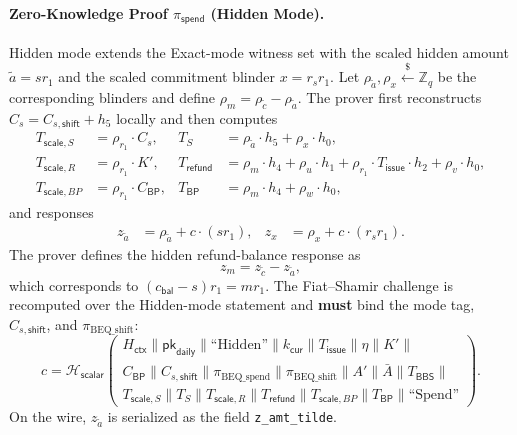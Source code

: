 \documentclass[11pt]{article}
\theoremstyle{definitionstyle}
\theoremstyle{plain}
\begin{document}
\paragraph{Zero-Knowledge Proof $\pi_{\mathsf{spend}}$ (Hidden Mode).}
Hidden mode extends the Exact-mode witness set with the scaled hidden amount $\widetilde{a} = s r_1$ and the scaled commitment blinder $x = r_s r_1$. Let $\rho_{\widetilde{a}}, \rho_x \xleftarrow{\$} \mathbb{Z}_q$ be the corresponding blinders and define $\rho_m = \rho_{\tilde{c}} - \rho_{\widetilde{a}}$. The prover first reconstructs $C_s = C_{s,\mathsf{shift}} + h_5$ locally and then computes
\begin{align*}
T_{\mathsf{scale},S} &= \rho_{r_1} \cdot C_s, & T_S &= \rho_{\widetilde{a}} \cdot h_5 + \rho_x \cdot h_0, \\
T_{\mathsf{scale},R} &= \rho_{r_1} \cdot K', & T_{\mathsf{refund}} &= \rho_m \cdot h_4 + \rho_u \cdot h_1 + \rho_{r_1} \cdot T_{\mathsf{issue}} \cdot h_2 + \rho_v \cdot h_0, \\
T_{\mathsf{scale},BP} &= \rho_{r_1} \cdot C_{\mathsf{BP}}, & T_{\mathsf{BP}} &= \rho_m \cdot h_4 + \rho_w \cdot h_0,
\end{align*}
and responses
\begin{align*}
z_{\widetilde{a}} &= \rho_{\widetilde{a}} + c \cdot (s r_1), & z_x &= \rho_x + c \cdot (r_s r_1).
\end{align*}
The prover defines the hidden refund-balance response as
\[
z_m = z_{\tilde{c}} - z_{\widetilde{a}},
\]
which corresponds to $(c_{\mathsf{bal}} - s) r_1 = m r_1$. The Fiat--Shamir challenge is recomputed over the Hidden-mode statement and \textbf{must} bind the mode tag, $C_{s,\mathsf{shift}}$, and $\pi_{\text{BEQ\_shift}}$:
\[
c = \mathcal{H}_{\mathsf{scalar}}\left(
\begin{array}{c}
H_{\mathsf{ctx}} \parallel \mathsf{pk}_{\mathsf{daily}} \parallel \text{``Hidden''} \parallel k_{\mathsf{cur}} \parallel T_{\mathsf{issue}} \parallel \eta \parallel K' \parallel \\
C_{\mathsf{BP}} \parallel C_{s,\mathsf{shift}} \parallel \pi_{\text{BEQ\_spend}} \parallel \pi_{\text{BEQ\_shift}} \parallel A' \parallel \bar{A} \parallel T_{\mathsf{BBS}} \parallel \\
T_{\mathsf{scale},S} \parallel T_S \parallel T_{\mathsf{scale},R} \parallel T_{\mathsf{refund}} \parallel T_{\mathsf{scale},BP} \parallel T_{\mathsf{BP}} \parallel \text{``Spend''}
\end{array}
\right).
\]
On the wire, $z_{\widetilde{a}}$ is serialized as the field
\texttt{z\_amt\_tilde}.
\end{document}

